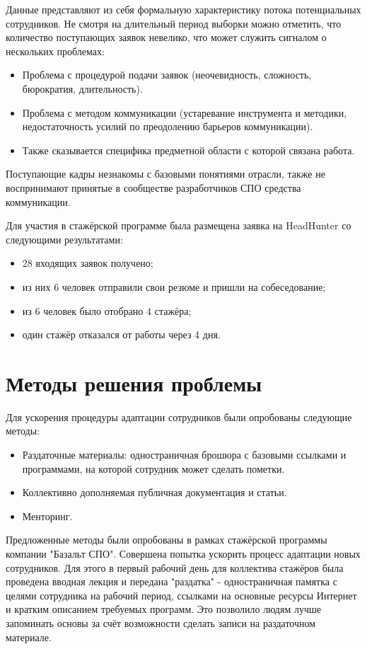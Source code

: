 Данные представляют из себя формальную характеристику потока
потенциальных сотрудников. Не смотря на длительный период выборки можно
отметить, что количество поступающих заявок невелико, что может служить
сигналом о нескольких проблемах:

\begin{itemize}
\item Проблема с процедурой подачи заявок (неочевидность, сложность,
бюрократия, длительность).
\item Проблема с методом коммуникации (устаревание инструмента и
методики, недостаточность усилий по преодолению барьеров коммуникации).
\item Также сказывается специфика предметной области с которой связана
работа.
\end{itemize}

Поступающие кадры незнакомы с базовыми понятиями отрасли, также не
воспринимают принятые в сообществе разработчиков СПО средства
коммуникации.

Для участия в стажёрской программе была размещена заявка на HeadHunter
со следующими результатами:

\begin{itemize}
\item 28 входящих заявок получено;
\item из них 6 человек отправили свои резюме и пришли на собеседование;
\item из 6 человек было отобрано 4 стажёра;
\item один стажёр отказался от работы через 4 дня.
\end{itemize}


\section{Методы решения проблемы}

Для ускорения процедуры адаптации сотрудников были опробованы следующие
методы:

\begin{itemize}
\item Раздаточные материалы: одностраничная брошюра с базовыми ссылками и
программами, на которой сотрудник может сделать пометки.
\item Коллективно дополняемая публичная документация и статьи.
\item Менторинг.
\end{itemize}

Предложенные методы были опробованы в рамках стажёрской программы
компании "Базальт СПО". Совершена попытка ускорить процесс адаптации
новых сотрудников. Для этого в первый рабочий день для коллектива
стажёров была проведена вводная лекция и передана "раздатка" -
одностраничная памятка с целями сотрудника на рабочий период, ссылками
на основные ресурсы Интернет и кратким описанием требуемых программ. Это
позволило людям лучше запоминать основы за счёт возможности сделать
записи на раздаточном материале.


